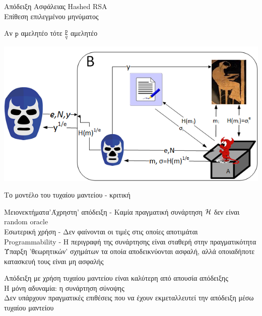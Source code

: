 \documentclass[handout]{beamer}
\begin{document}
\begin{frame}[allowframebreaks]{Απόδειξη Ασφάλειας Hashed RSA \\ Επίθεση επιλεγμένου μηνύματος}
\begin{center}
Αν $\mathrm{\mathtt{p}}$ αμελητέο τότε $\frac{\mathtt{p}}{q}$ αμελητέο
\end{center}

\framebreak

\begin{center}
\includegraphics[scale=0.7]{ro-chosenm.png}
\end{center}

\end{frame}

\begin{frame}{Το μοντέλο του τυχαίου μαντείου - κριτική}
\begin{small}
\begin{block}{\alert{Μειονεκτήματα}}'Άχρηστη' απόδειξη - Καμία πραγματική συνάρτηση $\mathcal{H}$ δεν είναι random oracle \\
\pause
Εσωτερική χρήση - Δεν φαίνονται οι τιμές στις οποίες αποτιμάται \\
\pause
Programmability - Η περιγραφή της συνάρτησης είναι σταθερή στην πραγματικότητα \\
\pause
Ύπαρξη 'θεωρητικών' σχημάτων τα οποία αποδεικνύονται ασφαλή, αλλά οποιαδήποτε κατασκευή τους είναι μη ασφαλής \\
\end{block}
\pause
\begin{block}{}
Απόδειξη με χρήση τυχαίου μαντείου είναι καλύτερη από απουσία απόδειξης \\
\pause
Η μόνη αδυναμία: η συνάρτηση σύνοψης \\
\pause
Δεν υπάρχουν πραγματικές επιθέσεις που να έχουν εκμεταλλευτεί την απόδειξη μέσω τυχαίου μαντείου
\end{block}
\end{small}
\end{frame}
\end{document}
